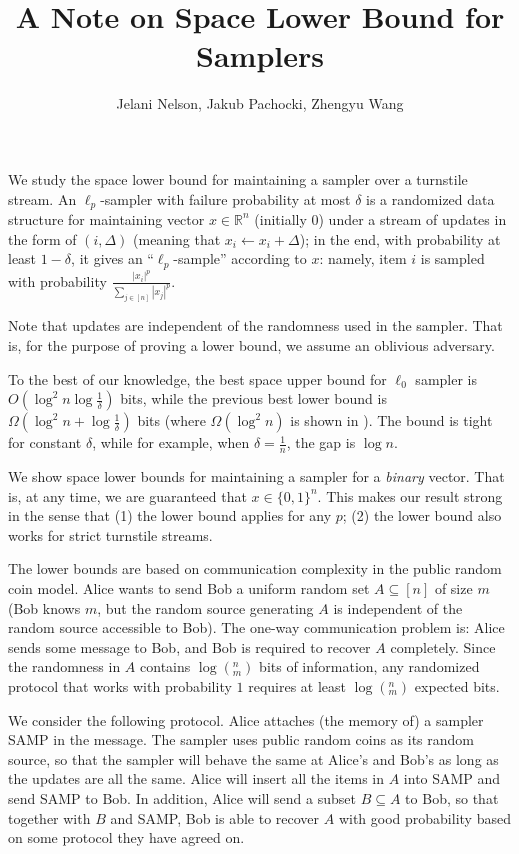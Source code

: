 \documentclass[10pt]{article}
\title{A Note on Space Lower Bound for Samplers}
\author{Jelani Nelson, Jakub Pachocki, Zhengyu Wang}
\newcommand{\samp}{\textsf{SAMP}\xspace}
\begin{document}
	
\maketitle

We study the space lower bound for maintaining a sampler over a turnstile stream. An $\ell_p$-sampler with failure probability at most $\delta$ is a randomized data structure for maintaining vector $x\in \mathbb{R}^n$ (initially 0) under a stream of updates in the form of $(i, \Delta)$ (meaning that $x_i \leftarrow x_i+\Delta$); in the end, with probability at least $1-\delta$, it gives an ``$\ell_p$-sample'' according to $x$: namely, item $i$ is sampled with probability $\frac{|x_i|^p}{\sum_{j\in [n]}{|x_j|^p}}$. 

Note that updates are independent of the randomness used in the sampler. That is, for the purpose of proving a lower bound, we assume an oblivious adversary. 

To the best of our knowledge, the best space upper bound for $\ell_0$ sampler is $O(\log^2 n \log \frac{1}{\delta})$ bits, while the previous best lower bound is $\Omega(\log^2 n +\log\frac{1}{\delta})$ bits (where $\Omega(\log^2 n)$ is shown in \cite{jowhari2011tight}). The bound is tight for constant $\delta$, while for example, when $\delta=\frac{1}{n}$, the gap is $\log n$. 

We show space lower bounds for maintaining a sampler for a {\em binary} vector. That is, at any time, we are guaranteed that $x\in \{0,1\}^n$. This makes our result strong in the sense that (1) the lower bound applies for any $p$; (2) the lower bound also works for strict turnstile streams.

The lower bounds are based on communication complexity in the public random coin model. Alice wants to send Bob a uniform random set $A\subseteq [n]$ of size $m$ (Bob knows $m$, but the random source generating $A$ is independent of the random source accessible to Bob). The one-way communication problem is: Alice sends some message to Bob, and Bob is required to recover $A$ completely. Since the randomness in $A$ contains $\log (^n_m)$ bits of information, any randomized protocol that works with probability $1$ requires at least $\log (^n_m)$ expected bits. 

We consider the following protocol. Alice attaches (the memory of) a sampler \samp in the message. The sampler uses public random coins as its random source, so that the sampler will behave the same at Alice's and Bob's as long as the updates are all the same. Alice will insert all the items in $A$ into \samp and send \samp to Bob. In addition, Alice will send a subset $B\subseteq A$ to Bob, so that together with $B$ and \samp, Bob is able to recover $A$ with good probability based on some protocol they have agreed on. 
 
\end{document}
